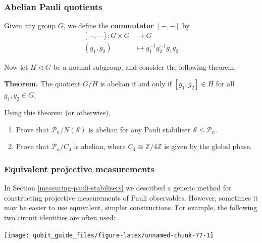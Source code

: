 \documentclass[fleqn,a4paper]{article}
\providecommand{\tightlist}{\setlength{\itemsep}{0pt}\setlength{\parskip}{0pt}}
\newenvironment{idea}{\everypar{\setlength{\parindent}{1.5em}}}{}
\theoremstyle{definition}
\theoremstyle{definition}
\theoremstyle{definition}
\theoremstyle{definition}
\theoremstyle{remark}
\begin{document}
\hypertarget{pauli-mod-normaliser-is-abelian}{%
\subsubsection{Abelian Pauli quotients}\label{pauli-mod-normaliser-is-abelian}}

Given any group \(G\), we define the \textbf{commutator} \([-,-]\) by
\[
  \begin{aligned}
    [-,-]\colon G\times G
    &\longrightarrow G
  \\(g_1,g_2)
    &\longmapsto g_1^{-1}g_2^{-1}g_1g_2
  \end{aligned}
\]

Now let \(H\triangleleft G\) be a normal subgroup, and consider the following theorem.

\begin{idea}
\textbf{Theorem.} The quotient \(G/H\) is abelian if and only if \([g_1,g_2]\in H\) for all \(g_1,g_2\in G\).

\end{idea}

Using this theorem (or otherwise),

\begin{enumerate}
\def\labelenumi{\arabic{enumi}.}
\tightlist
\item
  Prove that \(\mathcal{P}_n/N(\mathcal{S})\) is abelian for any Pauli stabiliser \(\mathcal{S}\leqslant\mathcal{P}_n\).
\item
  Prove that \(\mathcal{P}_n/C_4\) is abelian, where \(C_4\cong\mathbb{Z}/4\mathbb{Z}\) is given by the global phase.
\end{enumerate}

\hypertarget{equivalent-projective-pauli-measurements}{%
\subsubsection{Equivalent projective measurements}\label{equivalent-projective-pauli-measurements}}

In Section \ref{measuring-pauli-stabilisers} we described a generic method for constructing projective measurements of Pauli observables.
However, sometimes it may be easier to use equivalent, simpler constructions.
For example, the following two circuit identities are often used:

\begin{center}\texttt{[image: qubit\_guide\_files/figure-latex/unnamed-chunk-77-1]} \end{center}
\end{document}
